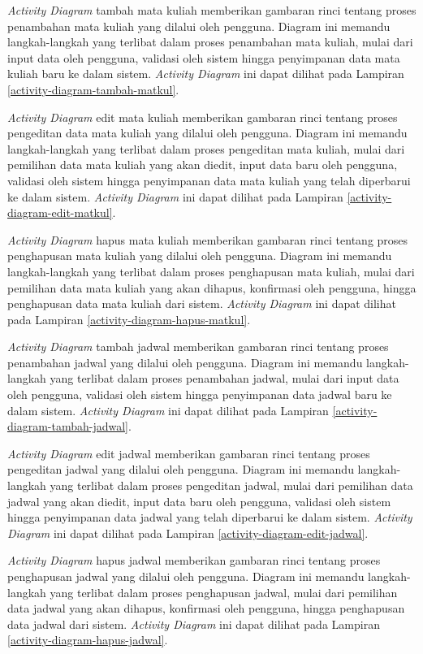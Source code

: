 \textit{Activity Diagram} tambah mata kuliah memberikan gambaran rinci tentang proses penambahan mata kuliah yang dilalui oleh pengguna. Diagram ini memandu langkah-langkah yang terlibat dalam proses penambahan mata kuliah, mulai dari input data oleh pengguna, validasi oleh sistem hingga penyimpanan data mata kuliah baru ke dalam sistem. \textit{Activity Diagram} ini dapat dilihat pada Lampiran \ref{activity-diagram-tambah-matkul}.


\textit{Activity Diagram} edit mata kuliah memberikan gambaran rinci tentang proses pengeditan data mata kuliah yang dilalui oleh pengguna. Diagram ini memandu langkah-langkah yang terlibat dalam proses pengeditan mata kuliah, mulai dari pemilihan data mata kuliah yang akan diedit, input data baru oleh pengguna, validasi oleh sistem hingga penyimpanan data mata kuliah yang telah diperbarui ke dalam sistem. \textit{Activity Diagram} ini dapat dilihat pada Lampiran \ref{activity-diagram-edit-matkul}.


\textit{Activity Diagram} hapus mata kuliah memberikan gambaran rinci tentang proses penghapusan mata kuliah yang dilalui oleh pengguna. Diagram ini memandu langkah-langkah yang terlibat dalam proses penghapusan mata kuliah, mulai dari pemilihan data mata kuliah yang akan dihapus, konfirmasi oleh pengguna, hingga penghapusan data mata kuliah dari sistem. \textit{Activity Diagram} ini dapat dilihat pada Lampiran \ref{activity-diagram-hapus-matkul}.


\textit{Activity Diagram} tambah jadwal memberikan gambaran rinci tentang proses penambahan jadwal yang dilalui oleh pengguna. Diagram ini memandu langkah-langkah yang terlibat dalam proses penambahan jadwal, mulai dari input data oleh pengguna, validasi oleh sistem hingga penyimpanan data jadwal baru ke dalam sistem. \textit{Activity Diagram} ini dapat dilihat pada Lampiran \ref{activity-diagram-tambah-jadwal}.


\textit{Activity Diagram} edit jadwal memberikan gambaran rinci tentang proses pengeditan jadwal yang dilalui oleh pengguna. Diagram ini memandu langkah-langkah yang terlibat dalam proses pengeditan jadwal, mulai dari pemilihan data jadwal yang akan diedit, input data baru oleh pengguna, validasi oleh sistem hingga penyimpanan data jadwal yang telah diperbarui ke dalam sistem. \textit{Activity Diagram} ini dapat dilihat pada Lampiran \ref{activity-diagram-edit-jadwal}.


\textit{Activity Diagram} hapus jadwal memberikan gambaran rinci tentang proses penghapusan jadwal yang dilalui oleh pengguna. Diagram ini memandu langkah-langkah yang terlibat dalam proses penghapusan jadwal, mulai dari pemilihan data jadwal yang akan dihapus, konfirmasi oleh pengguna, hingga penghapusan data jadwal dari sistem. \textit{Activity Diagram} ini dapat dilihat pada Lampiran \ref{activity-diagram-hapus-jadwal}.


